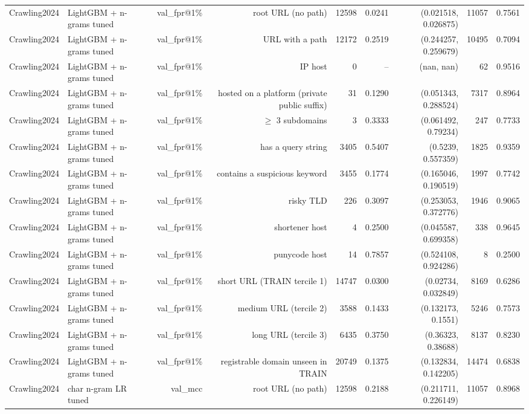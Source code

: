 \begin{table}[t]
\begin{tabular}{llrrrrrrr}
Crawling2024 & LightGBM + n-grams tuned & val\_fpr@1\% & root URL (no path) & 12598 & 0.0241 & (0.021518, 0.026875) & 11057 & 0.7561 \\
Crawling2024 & LightGBM + n-grams tuned & val\_fpr@1\% & URL with a path & 12172 & 0.2519 & (0.244257, 0.259679) & 10495 & 0.7094 \\
Crawling2024 & LightGBM + n-grams tuned & val\_fpr@1\% & IP host & 0 & -- & (nan, nan) & 62 & 0.9516 \\
Crawling2024 & LightGBM + n-grams tuned & val\_fpr@1\% & hosted on a platform (private public suffix) & 31 & 0.1290 & (0.051343, 0.288524) & 7317 & 0.8964 \\
Crawling2024 & LightGBM + n-grams tuned & val\_fpr@1\% & $\geq$ 3 subdomains & 3 & 0.3333 & (0.061492, 0.79234) & 247 & 0.7733 \\
Crawling2024 & LightGBM + n-grams tuned & val\_fpr@1\% & has a query string & 3405 & 0.5407 & (0.5239, 0.557359) & 1825 & 0.9359 \\
Crawling2024 & LightGBM + n-grams tuned & val\_fpr@1\% & contains a suspicious keyword & 3455 & 0.1774 & (0.165046, 0.190519) & 1997 & 0.7742 \\
Crawling2024 & LightGBM + n-grams tuned & val\_fpr@1\% & risky TLD & 226 & 0.3097 & (0.253053, 0.372776) & 1946 & 0.9065 \\
Crawling2024 & LightGBM + n-grams tuned & val\_fpr@1\% & shortener host & 4 & 0.2500 & (0.045587, 0.699358) & 338 & 0.9645 \\
Crawling2024 & LightGBM + n-grams tuned & val\_fpr@1\% & punycode host & 14 & 0.7857 & (0.524108, 0.924286) & 8 & 0.2500 \\
Crawling2024 & LightGBM + n-grams tuned & val\_fpr@1\% & short URL (TRAIN tercile 1) & 14747 & 0.0300 & (0.02734, 0.032849) & 8169 & 0.6286 \\
Crawling2024 & LightGBM + n-grams tuned & val\_fpr@1\% & medium URL (tercile 2) & 3588 & 0.1433 & (0.132173, 0.1551) & 5246 & 0.7573 \\
Crawling2024 & LightGBM + n-grams tuned & val\_fpr@1\% & long URL (tercile 3) & 6435 & 0.3750 & (0.36323, 0.38688) & 8137 & 0.8230 \\
Crawling2024 & LightGBM + n-grams tuned & val\_fpr@1\% & registrable domain unseen in TRAIN & 20749 & 0.1375 & (0.132834, 0.142205) & 14474 & 0.6838 \\
Crawling2024 & char n-gram LR tuned & val\_mcc & root URL (no path) & 12598 & 0.2188 & (0.211711, 0.226149) & 11057 & 0.8968 \\

\end{tabular}
\end{table}

